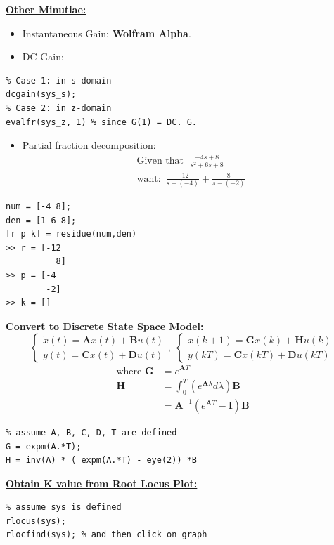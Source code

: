 \textbf{\underline{Other Minutiae:}}
\begin{itemize}
    \item Instantaneous Gain: \textbf{Wolfram Alpha}.
    \item DC Gain:
\end{itemize}
\begin{lstlisting}
% Case 1: in s-domain
dcgain(sys_s);
% Case 2: in z-domain
evalfr(sys_z, 1) % since G(1) = DC. G.
\end{lstlisting}

\begin{itemize}
    \item Partial fraction decomposition:
    \begin{align*}
        \text{Given that }\; \frac{-4s+8}{s^2+6s+8} \\
        \text{want: }\, \frac{-12}{s-(-4)} + \frac{8}{s-(-2)}
    \end{align*}
\end{itemize}
\begin{lstlisting}
num = [-4 8];
den = [1 6 8];
[r p k] = residue(num,den)
>> r = [-12 
          8]
>> p = [-4 
        -2]
>> k = []        
\end{lstlisting}

\textbf{\underline{Convert to Discrete State Space Model:}}
\begin{equation*}
    \begin{cases}
     \dot{x}(t) = \bm{A}x(t) + \bm{B}u(t) \\
     y(t) = \bm{C}x(t)+\bm{D} u(t)
    \end{cases}, \; \begin{cases}
     x(k+1) = \bm{G}x(k) + \bm{H}u(k) \\
     y(kT) = \bm{C}x(kT) + \bm{D}u(kT)
    \end{cases}
\end{equation*}
\begin{align*}
    \text{where } \bm{G} &= e^{\bm{A}T} \\
    \bm{H} &= \int_{0}^{T}\left(e^{\bm{A}\lambda} d\lambda\right) \bm{B} \\
    &= \bm{A}^{-1} (e^{\bm{A}T}- \bm{I})\bm{B}
\end{align*}
\begin{lstlisting}
% assume A, B, C, D, T are defined
G = expm(A.*T);
H = inv(A) * ( expm(A.*T) - eye(2)) *B
\end{lstlisting}

\textbf{\underline{Obtain K value from Root Locus Plot:}}
\vspace{0.3cm}
\begin{lstlisting}
% assume sys is defined
rlocus(sys);
rlocfind(sys); % and then click on graph
\end{lstlisting}

